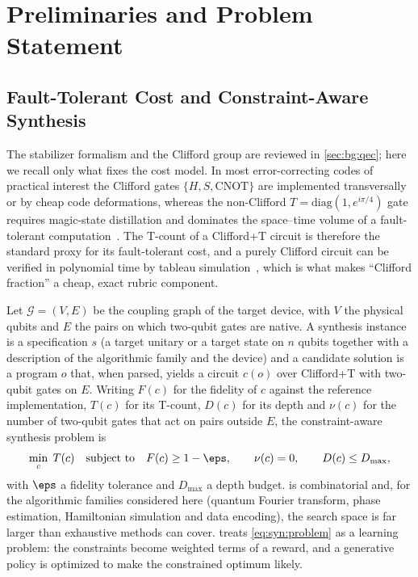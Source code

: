 \section{Preliminaries and Problem Statement}\label{sec:syn:prelim}

\subsection{Fault-Tolerant Cost and Constraint-Aware Synthesis}\label{sec:syn:ftcost}

The stabilizer formalism and the Clifford group are reviewed in \cref{sec:bg:qec}; here we recall only what fixes the cost model. In most error-correcting codes of practical interest the Clifford gates $\{H, S, \mathrm{CNOT}\}$ are implemented transversally or by cheap code deformations, whereas the non-Clifford $T=\mathrm{diag}(1,e^{i\pi/4})$ gate requires magic-state distillation and dominates the space--time volume of a fault-tolerant computation~\cite{bravyi2005magic,fowler2012surfacecodes}. The T-count of a Clifford+T circuit is therefore the standard proxy for its fault-tolerant cost, and a purely Clifford circuit can be verified in polynomial time by tableau simulation~\cite{gottesman1997stabilizer,aaronson2004stabilizer}, which is what makes ``Clifford fraction'' a cheap, exact rubric component.

Let $\mathcal{G}=(V,E)$ be the coupling graph of the target device, with $V$ the physical qubits and $E$ the pairs on which two-qubit gates are native. A synthesis instance is a specification $s$ (a target unitary or a target state on $n$ qubits together with a description of the algorithmic family and the device) and a candidate solution is a program $o$ that, when parsed, yields a circuit $c(o)$ over Clifford+T with two-qubit gates on $E$. Writing $F(c)$ for the fidelity of $c$ against the reference implementation, $T(c)$ for its T-count, $D(c)$ for its depth and $\nu(c)$ for the number of two-qubit gates that act on pairs outside $E$, the constraint-aware synthesis problem is
\begin{equation}\label{eq:syn:problem}
  \min_{c}\; T(c) \quad\text{subject to}\quad F(c)\ge 1-\eps,\qquad \nu(c)=0,\qquad D(c)\le D_{\max},
\end{equation}
with $\eps$ a fidelity tolerance and $D_{\max}$ a depth budget.  is combinatorial and, for the algorithmic families considered here (quantum Fourier transform, phase estimation, Hamiltonian simulation and data encoding), the search space is far larger than exhaustive methods can cover. \rubriq{} treats \cref{eq:syn:problem} as a learning problem: the constraints become weighted terms of a reward, and a generative policy is optimized to make the constrained optimum likely.

